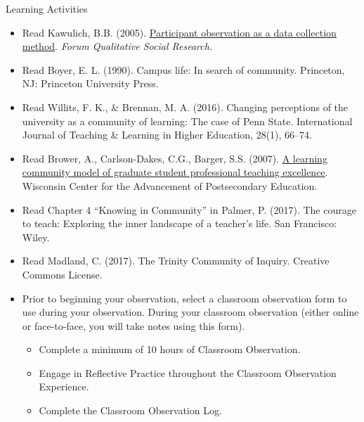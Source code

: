 \documentclass[
]{book}
\providecommand{\tightlist}{%
  \setlength{\itemsep}{0pt}\setlength{\parskip}{0pt}}
\begin{document}
\begin{reflect}
{Learning Activities }

\begin{itemize}
\tightlist
\item
  Read Kawulich, B.B. (2005). \href{http://www.qualitative-research.net/index.php/fqs/article/view/466/996}{Participant observation as a data collection method}. \emph{Forum Qualitative Social Research.}\\
\item
  Read Boyer, E. L. (1990). Campus life: In search of community. Princeton, NJ: Princeton University Press.
\item
  Read Willits, F. K., \& Brennan, M. A. (2016). Changing perceptions of the university as a community of learning: The case of Penn State. International Journal of Teaching \& Learning in Higher Education, 28(1), 66--74.\\
\item
  Read Brower, A., Carlson-Dakes, C.G., Barger, S.S. (2007). \href{https://wiscape.wisc.edu/docs/wiscapedocuments/wp003.pdf?sfvrsn=8}{A learning community model of graduate student professional teaching excellence}. Wisconsin Center for the Advancement of Postsecondary Education.\\
\item
  Read Chapter 4 ``Knowing in Community'' in Palmer, P. (2017). The courage to teach: Exploring the inner landscape of a teacher's life. San Francisco: Wiley.\\
\item
  Read Madland, C. (2017). The Trinity Community of Inquiry. Creative Commons License.\\
\item
  Prior to beginning your observation, select a classroom observation form to use during your observation. During your classroom observation (either online or face-to-face, you will take notes using this form).

  \begin{itemize}
  \tightlist
  \item
    Complete a minimum of 10 hours of Classroom Observation.\\
  \item
    Engage in Reflective Practice throughout the Classroom Observation Experience.\\
  \item
    Complete the Classroom Observation Log.
  \end{itemize}
\end{itemize}
\end{reflect}
\end{document}
